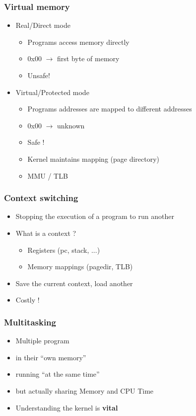 \begin{frame}
  \frametitle{Virtual memory}

  \begin{itemize}
  \item Real/Direct mode
    \begin{itemize}
    \item Programs access memory directly
    \item 0x00 $\rightarrow$ first byte of memory
    \item Unsafe!
    \end{itemize}
  \item Virtual/Protected mode
    \begin{itemize}
    \item Programs addresses are mapped to different addresses
    \item 0x00 $\rightarrow$ unknown
    \item Safe !
    \item Kernel maintains mapping (page directory)
    \item MMU / TLB
    \end{itemize}
  \end{itemize}
\end{frame}


\begin{frame}
  \frametitle{Context switching}

  \begin{itemize}
  \item Stopping the execution of a program to run another
  \item What is a context ?
    \begin{itemize}
    \item Registers (pc, stack, ...)
    \item Memory mappings (pagedir, TLB)
    \end{itemize}
  \item Save the current context, load another
  \item Costly !
  \end{itemize}
\end{frame}


\begin{frame}
  \frametitle{Multitasking}

  \begin{itemize}
  \item Multiple program
  \item in their ``own memory''
  \item running ``at the same time''
  \item but actually sharing Memory and CPU Time
  \item Understanding the kernel is \textbf{vital}
  \end{itemize}
\end{frame}






